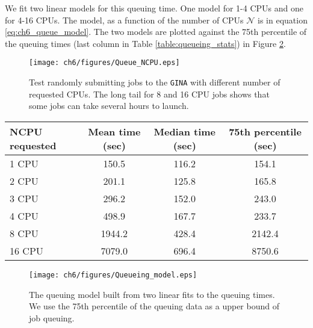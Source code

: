We fit two linear models for this queuing time. One model for 1-4 CPUs and one for 4-16 CPUs. The model, as a function of the number of CPUs $\mathcal{N}$ is in equation \ref{eq:ch6_queue_model}. The two models are plotted against the 75th percentile of the queuing times (last column in Table \ref{table:queueing_stats}) in Figure \ref{fig:ch6_queue_model}.

\begin{figure}
    \texttt{[image: ch6/figures/Queue\_NCPU.eps]}
      \caption[Queueing tests on the \texttt{GINA} cluster]{Test randomly submitting jobs to the \texttt{GINA} with different number of requested CPUs. The long tail for 8 and 16 CPU jobs shows that some jobs can take several hours to launch.  }
      
	\label{fig:ch6_queue_NCPU}
\end{figure}


\begin{table*}[t]
\centering
\begin{tabular}{||p{2.8cm}|c | c | c||} 
 \hline
 NCPU requested & Mean time (sec) & Median time (sec) & 75th percentile (sec)\\ [0.5ex]
 \hline
 1 CPU & 150.5   & 116.2 & 154.1   \\ 
 2 CPU & 201.1 & 125.8 & 165.8 \\
 3 CPU & 296.2 & 152.0 & 243.0 \\
 4 CPU & 498.9 & 167.7 & 233.7\\
 8 CPU & 1944.2 & 428.4 & 2142.4\\
 16 CPU & 7079.0 & 696.4 & 8750.6\\
 \hline
\end{tabular}
    \caption[Queueing statistics per requested number of CPUs]{Statistics for queuing time for different values of CPUs requested. Queuing time for jobs requesting less than 8 CPUs is typically less than five minutes. It can drastically increase for larger jobs. }
\label{table:queueing_stats}
\end{table*}

\begin{figure}
    \texttt{[image: ch6/figures/Queueing\_model.eps]}
      \caption[Model of queueing times]{The queuing model built from two linear fits to the queuing times. We use the 75th percentile of the queuing data as a upper bound of job queuing. }
	\label{fig:ch6_queue_model}
\end{figure}

